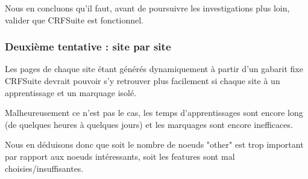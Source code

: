\documentclass{article}
\begin{document}
Nous en concluons qu'il faut, avant de poursuivre les investigations plus loin,
valider que CRFSuite est fonctionnel.

\subsubsection{Deuxième tentative : site par site}
Les pages de chaque site étant générés dynamiquement à partir d'un gabarit fixe
CRFSuite devrait pouvoir s'y retrouver plus facilement si chaque site à un apprentissage
et un marquage isolé.

Malheureusement ce n'est pas le cas, les temps d'apprentissages sont encore long (de
quelques heures à quelques jours) et les marquages sont encore inefficaces.

Nous en déduisons donc que soit le nombre de noeuds "other" est trop important par
rapport aux noeuds intéressants, soit les features sont mal choisies/insuffisantes.
\end{document}
